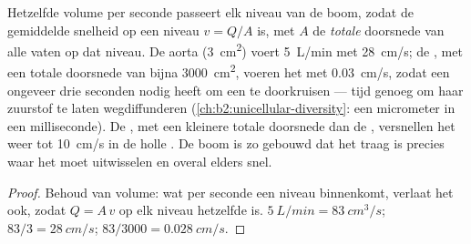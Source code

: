 \begin{theorem}\label{thm:b2:blood-circulation:continuity}
Hetzelfde volume per seconde passeert elk niveau van de boom, zodat de
gemiddelde snelheid op een niveau $v = Q/A$ is, met $A$ de \emph{totale}
doorsnede van alle vaten op dat niveau. De aorta
(\qty{3}{cm^2}) voert \qty{5}{L/min} met \qty{28}{cm/s}; de , met
een totale doorsnede van bijna \qty{3000}{cm^2}, voeren het met
\qty{0.03}{cm/s}, zodat een  ongeveer drie seconden nodig heeft om
een  te doorkruisen --- tijd genoeg om haar zuurstof te laten
wegdiffunderen (\cref{ch:b2:unicellular-diversity}: een micrometer in een
milliseconde). De , met een kleinere totale doorsnede dan de
, versnellen het  weer tot \qty{10}{cm/s} in de holle .
De boom is zo gebouwd dat het  traag is precies waar het moet
uitwisselen en overal elders snel.
\end{theorem}
\begin{proof}
Behoud van volume: wat per seconde een niveau binnenkomt, verlaat het ook,
zodat $Q = A\,v$ op elk niveau hetzelfde is. $\qty{5}{L/min} =
\qty{83}{cm^3/s}$; $83/3 = \qty{28}{cm/s}$; $83/3000 =
\qty{0.028}{cm/s}$.
\end{proof}

